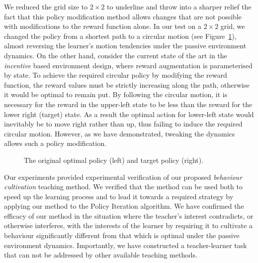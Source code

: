We reduced the grid size to $2\times 2$ to underline and throw
into a sharper relief the fact that this policy modification method
allows changes that are not possible with modifications to the reward
function alone. In our test on a $2 \times 2$ grid, we changed the
policy from a shortest path to a circular motion (see
Figure~\ref{envdopt}), almost reversing the learner's motion
tendencies under the passive environment dynamics. On the other hand,
consider the current state of the art in the {\em incentive} based
environment design, where reward augmentation is parameterised by
state. To achieve the required circular policy by modifying the reward
function, the reward values must be strictly increasing along the
path, otherwise it would be optimal to remain put. By following the
circular motion, it is necessary for the reward in the upper-left
state to be less than the reward for the lower right (target)
state. As a result the optimal action for lower-left state would
inevitably be to move right rather than up, thus failing to induce the
required circular motion. However, as we have demonstrated, tweaking
the dynamics allows such a policy modification.

\begin{figure}[ht]
\centerline{}
\caption{\label{envdopt}The original optimal policy (left) and target policy (right).}
\end{figure}

Our experiments provided experimental verification of our proposed
{\em behaviour cultivation} teaching method.  We verified that the
method can be used both to speed up the learning process and to lead
it towards a required strategy by applying our method to the Policy
Iteration algorithm. We have confirmed the efficacy of our method in
the situation where the teacher's interest contradicts, or otherwise
interferes, with the interests of the learner by requiring it to
cultivate a behaviour significantly different from that which is
optimal under the passive environment dynamics. Importantly, we have
constructed a teacher-learner task that can not be addressed by other
available teaching methods.
